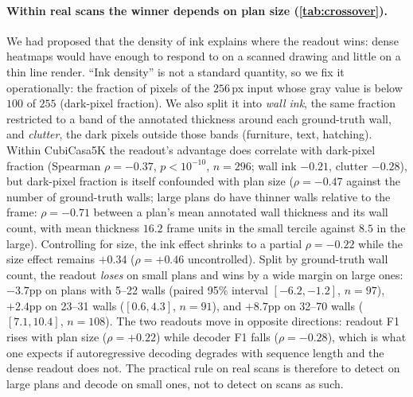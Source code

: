 \documentclass{article}
\begin{document}
\paragraph{Within real scans the winner depends on plan size
(\cref{tab:crossover}).} We had proposed that the density of ink explains
where the readout wins: dense heatmaps would have enough to respond to on a
scanned drawing and little on a thin line render. ``Ink density'' is not a
standard quantity, so we fix it operationally: the fraction of pixels of the
$256$\,px input whose gray value is below $100$ of $255$ (dark-pixel
fraction). We also split it into \emph{wall ink}, the same fraction restricted
to a band of the annotated thickness around each ground-truth wall, and
\emph{clutter}, the dark pixels outside those bands (furniture, text,
hatching). Within CubiCasa5K the readout's advantage does correlate with
dark-pixel fraction (Spearman $\rho=-0.37$, $p<10^{-10}$, $n=296$; wall ink
$-0.21$, clutter $-0.28$), but dark-pixel fraction is itself confounded with
plan size ($\rho=-0.47$ against the number of ground-truth walls; large plans
do have thinner walls relative to the frame: $\rho=-0.71$ between a plan's
mean annotated wall thickness and its wall count, with mean thickness $16.2$
frame units in the small tercile against $8.5$ in the large). Controlling for size, the ink
effect shrinks to a partial $\rho=-0.22$ while the size effect remains
$+0.34$ ($\rho=+0.46$ uncontrolled). Split by ground-truth wall count, the
readout \emph{loses} on small plans and wins by a wide margin on large ones:
$-3.7$pp on plans with 5--22 walls (paired 95\% interval $[-6.2,-1.2]$,
$n=97$), $+2.4$pp on 23--31 walls ($[0.6,4.3]$, $n=91$), and $+8.7$pp on
32--70 walls ($[7.1,10.4]$, $n=108$). The two readouts move in opposite
directions: readout F1 rises with plan size ($\rho=+0.22$) while decoder F1
falls ($\rho=-0.28$), which is what one expects if autoregressive decoding
degrades with sequence length and the dense readout does not. The practical
rule on real scans is therefore to detect on large plans and decode on small
ones, not to detect on scans as such.
\end{document}
